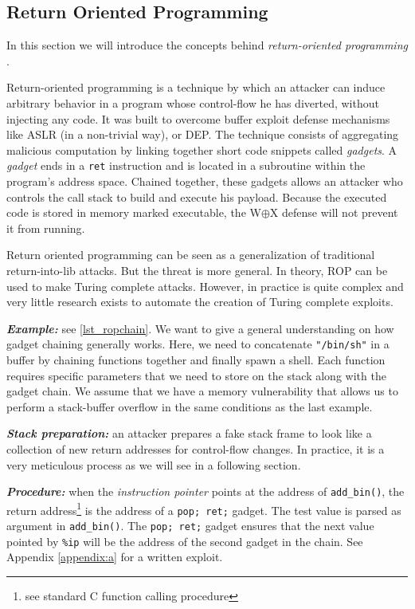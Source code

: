 \documentclass[10pt,twocolumn]{article}
\begin{document}
\subsection{Return Oriented Programming}
In this section we will introduce the concepts behind \textit{return-oriented programming
}\cite{roemer_return-oriented_2012}.

Return-oriented programming is a technique by which an attacker can induce
arbitrary behavior in a program whose control-flow he has diverted, without
injecting any code. It was built to overcome buffer exploit defense mechanisms
like ASLR (in a non-trivial way), or DEP. The technique consists of aggregating
malicious computation by linking together short code snippets called
\textit{gadgets}.  A \textit{gadget} ends in a \texttt{ret} instruction and is
located in a subroutine within the program's address space. Chained together,
these gadgets allows an attacker who controls the call stack to build and
execute his payload. Because the executed code is stored in memory marked
executable, the W$\oplus$X defense will not prevent it from running.

Return oriented programming can be seen as a generalization of traditional
return-into-lib attacks. But the threat is more general. In theory, ROP can be
used to make Turing complete attacks. However, in practice is quite complex and
very little research exists to automate the creation of Turing complete
exploits.

\textbf{\textit{Example:}} see \autoref{lst_ropchain}. We want to give a
general understanding on how gadget chaining generally works. Here, we need to
concatenate \texttt{"/bin/sh"} in a buffer by chaining functions together and
finally spawn a shell. Each function requires specific parameters that we need
to store on the stack along with the gadget chain. We assume that we have a
memory vulnerability that allows us to perform a stack-buffer overflow in the
same conditions as the last example.

\textbf{\textit{Stack preparation:}} an attacker prepares a fake stack frame to
look like a collection of new return addresses for control-flow changes. In
practice, it is a very meticulous process as we will see in a following
section.

\textbf{\textit{Procedure:}} when the \textit{instruction pointer} points at
the address of \texttt{add\_bin()}, the return address\footnote{see standard C
 function calling procedure} is the address of a
 \texttt{pop; ret;} gadget. The test value is parsed as argument in
 \texttt{add\_bin()}. The \texttt{pop; ret;} gadget ensures that the next value
 pointed by \texttt{\%ip} will be the address of the second gadget in the
 chain. See Appendix \ref{appendix:a} for a written exploit.
\end{document}
